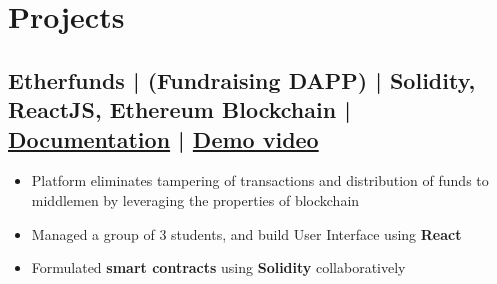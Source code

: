 \documentclass[a4,10pt]{article}
\newenvironment{zitemize}{
\begin{itemize}\itemsep0pt \parskip0pt \parsep1pt}
{\end{itemize}\vspace{-0.5cm}}
\begin{document}
\section{Projects} %






\subsection*{Etherfunds {\normalsize\normalfont | (Fundraising DAPP) | Solidity, ReactJS, Ethereum Blockchain } |  {\href{https://developersleague.github.io/Etherfunds/}{Documentation} } | {\href{https://youtu.be/UXFDYHBjoxo}{Demo video} }
} 
    \begin{zitemize}
        \item Platform eliminates tampering of transactions and distribution of funds to middlemen by leveraging the properties of blockchain
        \item Managed a group of 3 students, and build User Interface using \textbf{React}
        \item Formulated \textbf{smart contracts} using \textbf{Solidity} collaboratively
    \end{zitemize}
\end{document}
